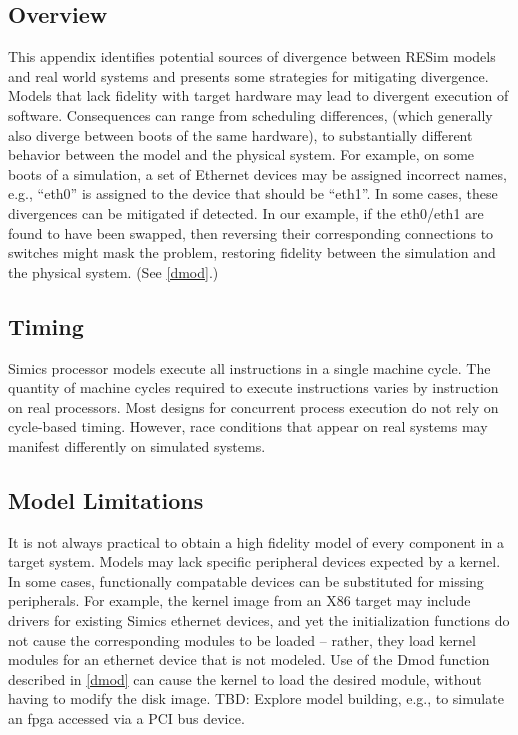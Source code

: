 \documentclass[titlepage]{article}
\begin{document}
\begin{appendices}
\subsection{Overview}
This appendix identifies potential sources of divergence between RESim models and
real world systems and presents some strategies for mitigating divergence.  
Models that lack fidelity with target hardware may lead to divergent execution of software.
Consequences can range from scheduling differences, (which generally also diverge between
boots of the same hardware), to substantially different behavior between the model and
the physical system.
For example, on some boots of a simulation, a set of Ethernet devices may be assigned incorrect names, e.g., ``eth0''
is assigned to the device that should be ``eth1''.  In some cases, these
divergences can be 
mitigated if detected.  In our example, if the eth0/eth1 are found to have been
swapped, then reversing their corresponding connections to switches might mask the problem,
restoring fidelity between the simulation and the physical system.  (See \ref{dmod}.)

\subsection{Timing}
Simics processor models execute all instructions in a single machine cycle.  The quantity
of machine cycles required to execute instructions varies by instruction on real processors.
Most designs for concurrent process execution do not rely on cycle-based timing.  However,
race conditions that appear on real systems may manifest differently on simulated systems.

\subsection{Model Limitations}
It is not always practical to obtain a high fidelity model of every component in a target system.  
Models may lack specific peripheral devices expected by a kernel.  In some cases, functionally
compatable devices can be substituted for missing peripherals.  For example, the kernel image from an
X86 target may include drivers for existing Simics ethernet devices, and yet the initialization functions
do not cause the corresponding modules to be loaded -- rather, they load kernel modules for an ethernet 
device that is not modeled.  Use of the Dmod function described in \ref{dmod} can cause the kernel
to load the desired module, without having to modify the disk image.  
TBD: Explore model building, e.g., to simulate an fpga accessed via a PCI bus device.


\end{appendices}
\end{document}
